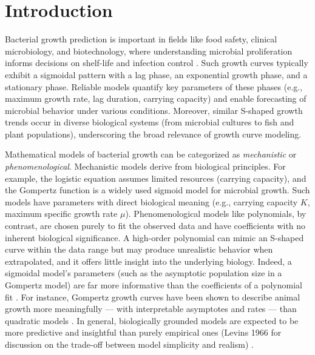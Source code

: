 \documentclass[11pt]{article}
\begin{document}
\pagebreak

\section{Introduction}
Bacterial growth prediction is important in fields like food safety, clinical microbiology, and biotechnology, where understanding microbial proliferation informs decisions on shelf-life and infection control \citep{MotulskyChristopoulos2004}. Such growth curves typically exhibit a sigmoidal pattern with a lag phase, an exponential growth phase, and a stationary phase. Reliable models quantify key parameters of these phases (e.g., maximum growth rate, lag duration, carrying capacity) and enable forecasting of microbial behavior under various conditions. Moreover, similar S-shaped growth trends occur in diverse biological systems (from microbial cultures to fish and plant populations), underscoring the broad relevance of growth curve modeling.

Mathematical models of bacterial growth can be categorized as \textit{mechanistic} or \textit{phenomenological}. Mechanistic models derive from biological principles. For example, the logistic equation assumes limited resources (carrying capacity), and the Gompertz function is a widely used sigmoid model for microbial growth. Such models have parameters with direct biological meaning (e.g., carrying capacity $K$, maximum specific growth rate $\mu$). Phenomenological models like polynomials, by contrast, are chosen purely to fit the observed data and have coefficients with no inherent biological significance. A high-order polynomial can mimic an S-shaped curve within the data range but may produce unrealistic behavior when extrapolated, and it offers little insight into the underlying biology. Indeed, a sigmoidal model’s parameters (such as the asymptotic population size in a Gompertz model) are far more informative than the coefficients of a polynomial fit \citep{GrasteauEtAl2000}. For instance, Gompertz growth curves have been shown to describe animal growth more meaningfully — with interpretable asymptotes and rates — than quadratic models \citep{GrasteauEtAl2000}. In general, biologically grounded models are expected to be more predictive and insightful than purely empirical ones (Levins 1966 for discussion on the trade-off between model simplicity and realism) \citep{Levins1966}.
\end{document}
